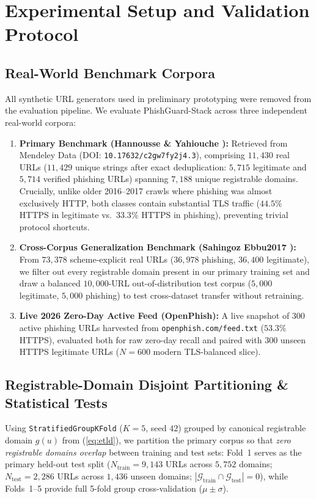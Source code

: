 \documentclass[conference]{IEEEtran}
\begin{document}
\section{Experimental Setup and Validation Protocol}
\label{sec:setup}

\subsection{Real-World Benchmark Corpora}
All synthetic URL generators used in preliminary prototyping were removed from the evaluation pipeline. We evaluate PhishGuard-Stack across three independent real-world corpora:
\begin{enumerate}
\item \textbf{Primary Benchmark (Hannousse \& Yahiouche \cite{hannousse2021}):} Retrieved from Mendeley Data (DOI: \texttt{10.17632/c2gw7fy2j4.3}), comprising $11{,}430$ real URLs ($11{,}429$ unique strings after exact deduplication: $5{,}715$ legitimate and $5{,}714$ verified phishing URLs) spanning $7{,}188$ unique registrable domains. Crucially, unlike older 2016--2017 crawls where phishing was almost exclusively HTTP, both classes contain substantial TLS traffic ($44.5\%$ HTTPS in legitimate vs.\ $33.3\%$ HTTPS in phishing), preventing trivial protocol shortcuts.
\item \textbf{Cross-Corpus Generalization Benchmark (Sahingoz Ebbu2017 \cite{sahingoz2019}):} From $73{,}378$ scheme-explicit real URLs ($36{,}978$ phishing, $36{,}400$ legitimate), we filter out every registrable domain present in our primary training set and draw a balanced $10{,}000$-URL out-of-distribution test corpus ($5{,}000$ legitimate, $5{,}000$ phishing) to test cross-dataset transfer without retraining.
\item \textbf{Live 2026 Zero-Day Active Feed (OpenPhish):} A live snapshot of $300$ active phishing URLs harvested from \texttt{openphish.com/feed.txt} ($53.3\%$ HTTPS), evaluated both for raw zero-day recall and paired with $300$ unseen HTTPS legitimate URLs ($N=600$ modern TLS-balanced slice).
\end{enumerate}

\subsection{Registrable-Domain Disjoint Partitioning \& Statistical Tests}
Using \texttt{StratifiedGroupKFold} ($K=5$, seed $42$) grouped by canonical registrable domain $g(u)$ from (\ref{eq:etld}), we partition the primary corpus so that \emph{zero registrable domains overlap} between training and test sets: Fold~1 serves as the primary held-out test split ($N_{\text{train}} = 9{,}143$ URLs across $5{,}752$ domains; $N_{\text{test}} = 2{,}286$ URLs across $1{,}436$ unseen domains; $|\mathcal{G}_{\text{train}} \cap \mathcal{G}_{\text{test}}| = 0$), while Folds~1--5 provide full 5-fold group cross-validation ($\mu \pm \sigma$).
\end{document}
